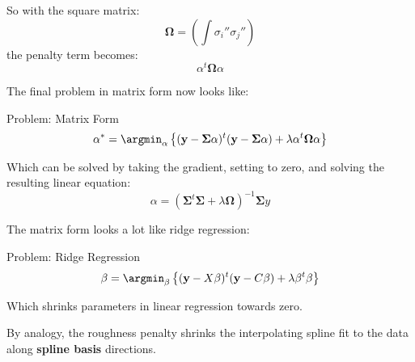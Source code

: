 %
%
\begin{frame}
  So with the square matrix:
  $$ \mathbf{\Omega} = \left( \int \sigma_i'' \sigma_j'' \right) $$
  the penalty term becomes:
  $$ \alpha^t \mathbf{\Omega} \alpha $$
\end{frame}
%
%
\begin{frame}
  The final problem in matrix form now looks like:
  \begin{block}{Problem: Matrix Form}
    $$\alpha^* = \argmin_{\alpha} \left\{ (\mathbf{y} - \mathbf{\Sigma} \mathbf{\alpha})^{t}(\mathbf{y} - \mathbf{\Sigma} \mathbf{\alpha}) + \lambda \alpha^t \mathbf{\Omega} \alpha \right\} $$ 
  \end{block}
  Which can be solved by taking the gradient, setting to zero, and solving the resulting linear equation:
  $$ \alpha = ( \mathbf{\Sigma}^t \mathbf{\Sigma} + \lambda \mathbf{\Omega} )^{-1} \mathbf{\Sigma} y $$
\end{frame}
%
%
\begin{frame}
  The matrix form looks a lot like ridge regression:
  \begin{block}{Problem: Ridge Regression}
    $$ \beta = \argmin_{\beta} \left\{ (\mathbf{y} - X \beta)^t (\mathbf{y} - C \beta) + \lambda \beta^t \beta \right\} $$
 \end{block}
 Which shrinks parameters in linear regression towards zero.
\end{frame}
%
%
\begin{frame}
  By analogy, the roughness penalty shrinks the interpolating spline fit to the data along \textbf{spline basis} directions.
\end{frame}
